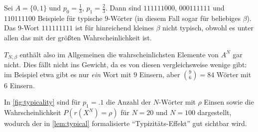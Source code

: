 \begin{example}
  Sei $A = \{0,1\}$ und $p_0 = \frac13$, $p_1 = \frac23$. Dann sind $111111000$, $000111111$ und $110111100$ Beispiele für typische $9$-Wörter (in diesem Fall sogar für beliebiges $β$). Das $9$-Wort $111111111$ ist für hinreichend kleines $β$ nicht typisch, obwohl es unter allen das mit der größten Wahrscheinlichkeit ist.
  
  $T_{N,β}$ enthält also im Allgemeinen die wahrscheinlichsten Elemente von $A^N$ gar nicht. Dies fällt nicht ins Gewicht, da es von diesen vergleichsweise wenige gibt: im Beispiel etwa gibt es nur \emph{ein} Wort mit $9$ Einsern, aber $\binom96 = 84$ Wörter mit $6$ Einsern.
  
  In \cref{fig:typicality} sind für $p_1=\num{.1}$ die Anzahl der $N$-Wörter mit $ρ$ Einsen sowie die Wahrscheinlichkeit $P(r(X^N)=ρ)$ für $N=20$ und $N=100$ dargestellt, wodurch der in \cref{lem:typical} formalisierte \enquote{Typizitäts-Effekt} gut sichtbar wird.
\end{example}

